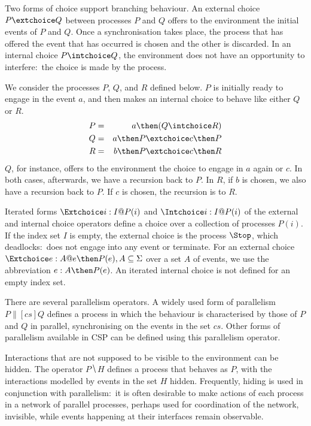 Two forms of choice support branching behaviour. An external choice $P
\extchoice Q$ between processes $P$ and $Q$ offers to the environment the
initial events of $P$ and $Q$. Once a synchronisation takes place, the
process that has offered the event that has occurred is chosen and the other
is discarded. In an internal choice $P \intchoice Q$, the environment does
not have an opportunity to interfere:~the choice is made by the process.
%
\begin{example}\label{example:CSP}
  We consider the processes $P$, $Q$, and $R$ defined below. $P$ is initially
  ready to engage in the event $a$, and then makes an internal choice to
  behave like either $Q$ or $R$.
  \begin{eqnarray*}
  P & = & a \then (Q\intchoice R)
  \\
  Q & = & a \then P \extchoice c \then P
  \\
  R & = & b \then P \extchoice c \then R
  \end{eqnarray*}
  $Q$, for instance, offers to the environment the choice to engage in $a$
  again or $c$. In both cases, afterwards, we have a recursion back to $P$.
  In $R$, if $b$ is chosen, we also have a recursion back to $P$. If $c$ is
  chosen, the recursion is to $R$.
  \xbox
\end{example}
%
Iterated forms $\Extchoice i: I @ P(i)$ and $\Intchoice i: I @ P(i)$ of the
external and internal choice operators define a choice over a collection of
processes $P(i)$. If the index set $I$ is empty, the external choice is the
process $\Stop$, which deadlocks:~does not engage into any event or
terminate. For an external choice $\Extchoice e: A @ e \then P(e), A\subseteq
\Sigma$ over a set $A$ of events, we use the abbreviation $e:A \then P(e)$.
An iterated internal choice is not defined for an empty index set.

There are several parallelism operators. A widely used form of parallelism $P
\parallel[cs] Q$ defines a process in which the behaviour is characterised by
those of $P$ and $Q$ in parallel, synchronising on the events in the set
$cs$. Other forms of parallelism available in CSP can be defined using this
parallelism operator.

Interactions that are not supposed to be visible to the environment can be
hidden. The operator $P \hide H$ defines a process that behaves as $P$, with
the interactions modelled by events in the set $H$ hidden. Frequently, hiding
is used in conjunction with parallelism:~it is often desirable to make
actions of each process in a network of parallel processes, perhaps used for
coordination of the network, invisible, while events happening at their
interfaces remain observable.

